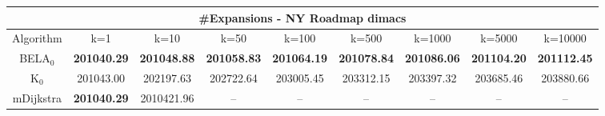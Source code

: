 \begin{tabular}{c|cccccccc}\toprule
\multicolumn{9}{c}{#Expansions - NY Roadmap dimacs}\\ \midrule
Algorithm & k=1 & k=10 & k=50 & k=100 & k=500 & k=1000 & k=5000 & k=10000 \\ \midrule
BELA$_0$ & \textbf{201040.29} & \textbf{201048.88} & \textbf{201058.83} & \textbf{201064.19} & \textbf{201078.84} & \textbf{201086.06} & \textbf{201104.20} & \textbf{201112.45} \\
K$_0$ & 201043.00 & 202197.63 & 202722.64 & 203005.45 & 203312.15 & 203397.32 & 203685.46 & 203880.66 \\
mDijkstra & \textbf{201040.29} & 2010421.96 & -- & -- & -- & -- & -- & -- \\ \bottomrule 
\end{tabular}
